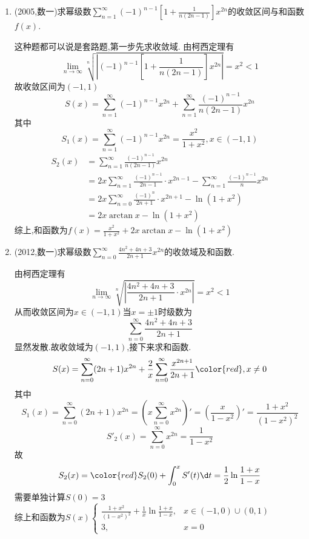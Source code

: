 \documentclass[12pt, a4paper, oneside, UTF8]{ctexbook}
\begin{document}
\begin{enumerate}[label=\arabic*.,start=8]
    \item (2005,数一)求幂级数$\displaystyle\sum_{n=1}^{\infty}(-1)^{n-1}\left[1+\frac{1}{n(2n-1)}\right] x^{2n}$的收敛区间与和函数$f(x)$.
    
    \begin{solution}
    这种题都可以说是套路题,第一步先求收敛域. 由柯西定理有
    $$
        \lim_{n\to\infty}\sqrt[n]{\left|(-1)^{n-1}\left[1+\frac{1}{n(2n-1)}\right]x^{2n}\right|} = x^2 < 1
    $$
    故收敛区间为$(-1,1)$ 
    $$
        S(x)=\sum_{n=1}^{\infty}(-1)^{n-1}x^{2n}+\sum_{n=1}^{\infty}\frac{(-1)^{n-1}}{n(2n-1)}x^{2n} 
    $$
    其中
    $$
        S_1(x) = \sum_{n=1}^{\infty}(-1)^{n-1}x^{2n} = \frac{x^2}{1+x^2}, x\in(-1,1)
    $$
    \begin{align*}
        S_2(x) & = \sum_{n=1}^{\infty}\frac{(-1)^{n-1}}{n(2n-1)}x^{2n} \\
        &= 2x\sum_{n=1}^{\infty}\frac{(-1)^{n-1}}{2n-1}\cdot x^{2n-1}-\sum_{n=1}^{\infty}\frac{(-1)^{n-1}}{n}x^{2n} \\
        &=2x\sum_{n=0}^{\infty}\frac{(-1)^{n}}{2n+1}\cdot x^{2n+1} - \ln{(1+x^2)} \\
        &=2x\arctan{x}-\ln{(1+x^2)}
    \end{align*}
    综上,和函数为$f(x)=\frac{x^2}{1+x^2}+2x\arctan{x}-\ln{(1+x^2)}$
    \end{solution}
    
    \item (2012,数一)求幂级数$\displaystyle\sum_{n=0}^{\infty}\frac{4n^2+4n+3}{2n+1} x^{2n}$的收敛域及和函数.
    
    \begin{solution}
    由柯西定理有
    $$
        \lim_{n\to\infty}\sqrt[n]{\left|\frac{4n^2+4n+3}{2n+1}\cdot x^{2n}\right|} = x^2 < 1 
    $$
    从而收敛区间为$x\in(-1,1)$当$x=\pm 1$时级数为
    $$
        \sum_{n=0}^{\infty}\frac{4n^2+4n+3}{2n+1}
    $$
    显然发散.故收敛域为$(-1,1)$,接下来求和函数. 
    \begin{align*}
        S(x)=\sum_{n=0}^{\infty}(2n+1)x^{2n} + \frac{2}{x}\sum_{n=0}^{\infty}\frac{x^{2n+1}}{2n+1}{\color{red},x\neq 0}
    \end{align*}
    其中
    $$
    S_1(x) = \sum_{n=0}^{\infty}(2n+1)x^{2n} = (x\sum_{n=0}^{\infty}x^{2n})' = \left(\frac{x}{1-x^2}\right)' = \frac{1+x^2}{(1-x^2)^2}
    $$
    $$
    S'_2(x) = \sum_{n=0}^{\infty}x^{2n} = \frac{1}{1-x^2}
    $$
    故
    $$
    S_2(x)={\color{red}S_2(0)}+\int_{0}^{x}S'(t)\d t = \frac{1}{2}\ln{\frac{1+x}{1-x}}
    $$ 
    需要单独计算$S(0)=3$ \\
    综上和函数为$S(x)\begin{cases}
        \displaystyle \frac{1+x^2}{(1-x^2)^2}+\frac{1}{x}\ln{\frac{1+x}{1-x}}, &x\in(-1,0)\cup(0,1) \\
        3, &x=0
    \end{cases}$
    \end{solution}
    

\end{enumerate}
\end{document}
